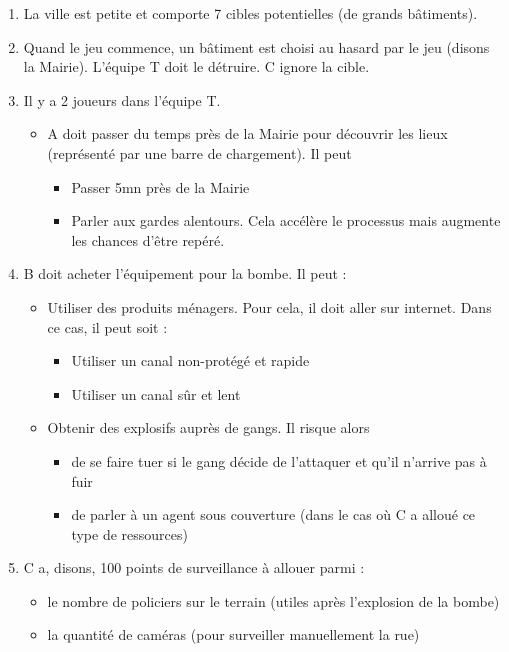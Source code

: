 \documentclass[a4paper,10pt]{article}
\begin{document}
\begin{enumerate}
\item La ville est petite et comporte 7 cibles potentielles (de grands bâtiments).
\item Quand le jeu commence, un bâtiment est choisi au hasard par le jeu (disons la Mairie). L'équipe T doit le détruire. C ignore la cible.
\item Il y a 2 joueurs dans l'équipe T.
  \begin{itemize}
  \item A doit passer du temps près de la Mairie pour découvrir les lieux (représenté par une barre de chargement). Il peut
    \begin{itemize}
    \item Passer 5mn près de la Mairie
    \item Parler aux gardes alentours. Cela accélère le processus mais augmente les chances d'être repéré.
    \end{itemize}
    \end{itemize}
  \item B doit acheter l'équipement pour la bombe. Il peut :
  \begin{itemize}
    \item Utiliser des produits ménagers. Pour cela, il doit aller sur internet. Dans ce cas, il peut soit :
    \begin{itemize}
      \item Utiliser un canal non-protégé et rapide
      \item Utiliser un canal sûr et lent
      \end{itemize}
    \item Obtenir des explosifs auprès de gangs. Il risque alors 
    \begin{itemize}
      \item de se faire tuer si le gang décide de l'attaquer et qu'il n'arrive pas à fuir
      \item de parler à un agent sous couverture (dans le cas où C a alloué ce type de ressources)
      \end{itemize}
      \end{itemize}
\item C a, disons, 100 points de surveillance à allouer parmi :
\begin{itemize}
  \item le nombre de policiers sur le terrain (utiles après l'explosion de la bombe)
  \item la quantité de caméras (pour surveiller manuellement la rue)

\end{itemize}
\end{enumerate}
\end{document}
